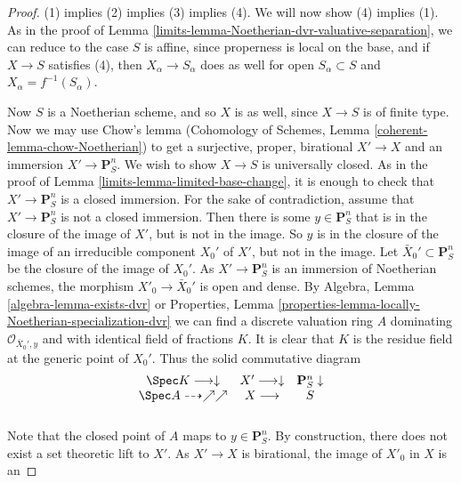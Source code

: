 \begin{proof}

(1) implies (2) implies (3) implies (4).  We will now show (4) implies
(1).  As in the proof of Lemma \ref{limits-lemma-Noetherian-dvr-valuative-separation},
we can reduce to the
case $S$ is affine, since properness is local on the base, and if $X
\to S$ satisfies (4), then $X_\alpha \to S_\alpha$ does as well for
open $S_\alpha \subset S$ and $X_\alpha = f^{-1}(S_\alpha)$.

\medskip\noindent
Now $S$ is a Noetherian scheme, and so $X$ is as well, since $X \to
S$ is of finite type.  Now we may use Chow's lemma
(Cohomology of Schemes, Lemma \ref{coherent-lemma-chow-Noetherian})
to get a surjective, proper, birational
$X' \to X$ and an immersion $X' \to \mathbf{P}^n_S$.  We wish to
show $X \to S$ is universally closed.  As in the proof of Lemma
\ref{limits-lemma-limited-base-change}, it is enough to check that
$X' \to \mathbf{P}^n_S$ is a closed immersion.
For the sake of contradiction, assume that $X' \to
\mathbf{P}^n_S$ is not a closed immersion.  Then there is some $y
\in \mathbf{P}^n_S$ that is in the closure of the image of $X'$, but
is not in the image.  So $y$ is in the closure of the image of an
irreducible component $X_0'$ of $X'$, but not in the image.
Let $\bar X_0' \subset \mathbf{P}^n_S$ be the closure of
the image of $X_0'$. As $X' \to \mathbf{P}^n_S$ is an immersion
of Noetherian schemes, the morphism $X'_0 \to \bar X_0'$ is
open and dense. By
Algebra, Lemma \ref{algebra-lemma-exists-dvr}
or
Properties, Lemma \ref{properties-lemma-locally-Noetherian-specialization-dvr}
we can find a discrete valuation ring $A$ dominating
$\mathcal{O}_{\bar X_0', y}$ and with identical field
of fractions $K$. It is clear that
$K$ is the residue field at the generic point of $X_0'$.
Thus the solid commutative diagram
\begin{equation}
\label{equation-solid}
\begin{array}{ccc}\Spec K \longrightarrow\downarrow & X' \longrightarrow\downarrow & \mathbf{P}^n_S \downarrow \\ \Spec A \dashrightarrow\nearrow\nearrow & X \longrightarrow & S \\  &  & \end{array}
\end{equation}
Note that the closed point of $A$ maps to $y \in \mathbf{P}^n_S$.  By
construction, there does not exist a set theoretic lift to $X'$.
As $X' \to X$ is birational, the image of $X'_0$ in $X$ is an

\end{proof}
